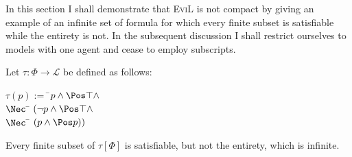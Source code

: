 In this section I shall demonstrate that \textsc{EviL} is not compact by giving an example of an infinite set of formula for which every finite subset is satisfiable while the entirety is not.  In the subsequent discussion I shall restrict ourselves to models with one agent and cease to employ subscripts.

\begin{lemma}%
Let $\tau : \Phi \to \mathcal{L}$ be defined as follows:
\begin{center}
\begin{minipage}{3in}
\begin{tabbing}
	$\tau(p) := $ \=$p \wedge \Pos\top \wedge$ \\
	\> $\Nec$ \= $(\neg p \wedge \Pos\top \wedge$\\
	\> \> $\Nec$ \= $(p \wedge \Pos p))$
\end{tabbing}
\end{minipage}
\end{center}
Every finite subset of $\tau[\Phi]$ is satisfiable, but not the entirety, which is infinite. 
\elem\end{lemma}
